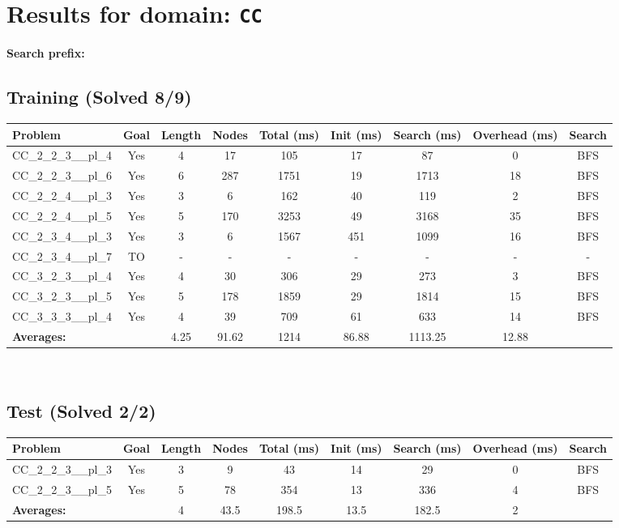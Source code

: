\documentclass{article}
\begin{document}
\section*{Results for domain: \texttt{CC}}
\textbf{Search prefix:} 
\\[0.5cm]
\subsection*{Training (Solved 8/9)}
\begin{tabular}{lcccccccc}
\toprule
Problem & Goal & Length & Nodes & Total (ms) & Init (ms) & Search (ms) & Overhead (ms) & Search \\
\midrule
CC\_2\_2\_3\_\_pl\_4 & Yes & 4 & 17 & 105 & 17 & 87 & 0 & BFS \\
CC\_2\_2\_3\_\_pl\_6 & Yes & 6 & 287 & 1751 & 19 & 1713 & 18 & BFS \\
CC\_2\_2\_4\_\_pl\_3 & Yes & 3 & 6 & 162 & 40 & 119 & 2 & BFS \\
CC\_2\_2\_4\_\_pl\_5 & Yes & 5 & 170 & 3253 & 49 & 3168 & 35 & BFS \\
CC\_2\_3\_4\_\_pl\_3 & Yes & 3 & 6 & 1567 & 451 & 1099 & 16 & BFS \\
CC\_2\_3\_4\_\_pl\_7 & TO & - & - & - & - & - & - & - \\
CC\_3\_2\_3\_\_pl\_4 & Yes & 4 & 30 & 306 & 29 & 273 & 3 & BFS \\
CC\_3\_2\_3\_\_pl\_5 & Yes & 5 & 178 & 1859 & 29 & 1814 & 15 & BFS \\
CC\_3\_3\_3\_\_pl\_4 & Yes & 4 & 39 & 709 & 61 & 633 & 14 & BFS \\
\textbf{Averages:} & & 4.25 & 91.62 & 1214 & 86.88 & 1113.25 & 12.88 & \\
\bottomrule
\end{tabular}
\\[0.7cm]
\subsection*{Test (Solved 2/2)}
\begin{tabular}{lcccccccc}
\toprule
Problem & Goal & Length & Nodes & Total (ms) & Init (ms) & Search (ms) & Overhead (ms) & Search \\
\midrule
CC\_2\_2\_3\_\_pl\_3 & Yes & 3 & 9 & 43 & 14 & 29 & 0 & BFS \\
CC\_2\_2\_3\_\_pl\_5 & Yes & 5 & 78 & 354 & 13 & 336 & 4 & BFS \\
\textbf{Averages:} & & 4 & 43.5 & 198.5 & 13.5 & 182.5 & 2 & \\
\bottomrule
\end{tabular}
\\[0.7cm]
\end{document}

